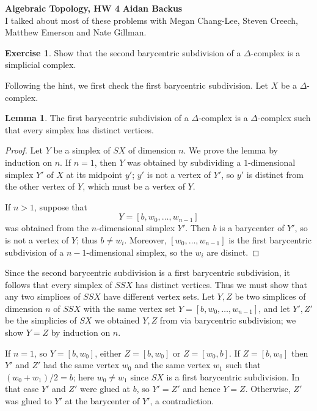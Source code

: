 \documentclass[10pt]{article}
\theoremstyle{definition}
\newtheorem{exer}{Exercise}
\newtheorem{lemma}{Lemma}[exer]
\begin{document}
\noindent
\large\textbf{Algebraic Topology, HW 4} \hfill \textbf{Aidan Backus} \\


I talked about most of these problems with Megan Chang-Lee, Steven Creech, Matthew Emerson and Nate Gillman.

\begin{exer}
Show that the second barycentric subdivision of a $\Delta$-complex is a simplicial complex.
\end{exer}

Following the hint, we first check the first barycentric subdivision.
Let $X$ be a $\Delta$-complex.

\begin{lemma}
The first barycentric subdivision of a $\Delta$-complex is a $\Delta$-complex such that every simplex has distinct vertices.
\end{lemma}
\begin{proof}
Let $Y$ be a simplex of $SX$ of dimension $n$.
We prove the lemma by induction on $n$. If $n = 1$, then $Y$ was obtained by subdividing a $1$-dimensional simplex $Y'$ of $X$ at its midpoint $y'$; $y'$ is not a vertex of $Y'$, so $y'$ is distinct from the other vertex of $Y$, which must be a vertex of $Y$.

If $n > 1$, suppose that
$$Y = [b, w_0, \dots, w_{n-1}]$$
was obtained from the $n$-dimensional simplex $Y'$. Then $b$ is a barycenter of $Y'$, so is not a vertex of $Y$; thus $b \neq w_i$.
Moreover, $[w_0, \dots, w_{n-1}]$ is the first barycentric subdivision of a $n-1$-dimensional simplex, so the $w_i$ are disinct.
\end{proof}

Since the second barycentric subdivision is a first barycentric subdivision, it follows that every simplex of $SSX$ has distinct vertices.
Thus we must show that any two simplices of $SSX$ have different vertex sets.
Let $Y,Z$ be two simplices of dimension $n$ of $SSX$ with the same vertex set $Y = [b, w_0, \dots, w_{n-1}]$, and let $Y',Z'$ be the simplicies of $SX$ we obtained $Y,Z$ from via barycentric subdivision; we show $Y = Z$ by induction on $n$.

If $n = 1$, so $Y = [b, w_0]$, either $Z = [b, w_0]$ or $Z = [w_0, b]$.
If $Z = [b, w_0]$ then $Y'$ and $Z'$ had the same vertex $w_0$ and the same vertex $w_1$ such that $(w_0 + w_1)/2 = b$; here $w_0 \neq w_1$ since $SX$ is a first barycentric subdivision.
In that case $Y'$ and $Z'$ were glued at $b$, so $Y' = Z'$ and hence $Y = Z$.
Otherwise, $Z'$ was glued to $Y'$ at the barycenter of $Y'$, a contradiction.
\end{document}
